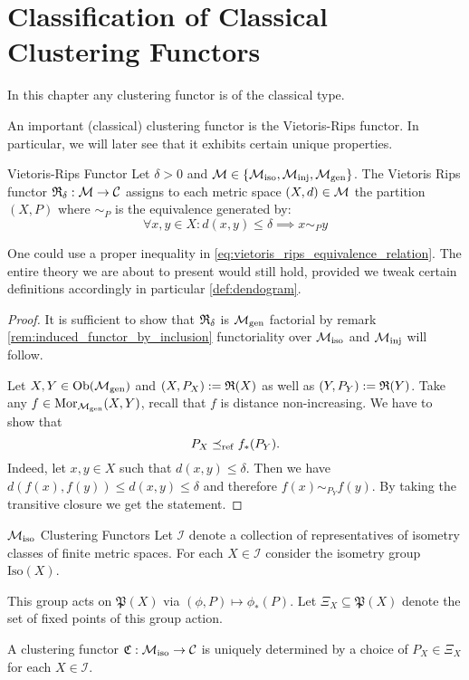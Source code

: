 \chapter{Classification of Classical Clustering Functors}
In this chapter any clustering functor is of the classical type.

An important (classical) clustering functor is the Vietoris-Rips functor.
In particular, we will later see that it exhibits certain unique properties.

\begin{defprop}{Vietoris-Rips Functor}{}
    Let $\delta > 0$ and $\mathcal{M} \in \{{\mathcal{M}_\mathrm{iso}}, {\mathcal{M}_\mathrm{inj}}, {\mathcal{M}_\mathrm{gen}}\}$. The Vietoris Rips functor $\mathfrak{R}_\delta: \mathcal{M} \to \mathcal{C}$ assigns to each metric space $(X,d) \in \mathcal{M}$ the partition $(X,P)$ where $\sim_P$ is the equivalence generated by:
    \begin{equation}
        \label{eq:vietoris_rips_equivalence_relation}
        \forall x,y \in X: d(x,y) \leq \delta \implies x \sim_P y
    \end{equation}
\end{defprop}

One could use a proper inequality in \eqref{eq:vietoris_rips_equivalence_relation}. The entire theory we are about to present would still hold, provided we tweak certain definitions accordingly in particular \ref{def:dendogram}.

\begin{proof}
It is sufficient to show that $\mathfrak{R}_\delta$ is ${\mathcal{M}_\mathrm{gen}}$ factorial by remark \ref{rem:induced_functor_by_inclusion} functoriality over ${\mathcal{M}_\mathrm{iso}}$ and ${\mathcal{M}_\mathrm{inj}}$ will follow.

Let $X,Y \in \mathrm {Ob}({\mathcal{M}_\mathrm{gen}})$ and $(X,P_X) := \mathfrak{R}(X)$ as well as $(Y,P_Y) := \mathfrak{R}(Y)$.
Take any $f \in \mathrm {Mor}_{\mathcal{M}_\mathrm{gen}}(X,Y)$, recall that $f$ is distance non-increasing.
We have to show that 
$$P_X \preceq_\mathrm{ref} f_*(P_Y).$$
Indeed, let $x,y \in X$ such that $d(x,y) \leq \delta$.
Then we have $d(f(x), f(y)) \leq d(x,y) \leq \delta$ and therefore $f(x) \sim_{P_Y} f(y)$.
By taking the transitive closure we get the statement.
\end{proof}

\begin{myremark}{${\mathcal{M}_\mathrm{iso}}$ Clustering Functors}{}
Let $\mathcal{I}$ denote a collection of representatives of isometry classes of finite metric spaces.
For each $X \in \mathcal{I}$ consider the isometry group $\mathrm{Iso}(X)$. \par

\medskip This group acts on $\mathfrak{P}(X)$ via $(\phi, P) \mapsto \phi_*(P)$.
Let $\Xi_X \subseteq \mathfrak{P}(X)$ denote the set of fixed points of this group action. \par

\medskip A clustering functor $\mathfrak{C}: {\mathcal{M}_\mathrm{iso}} \to \mathcal{C}$ is uniquely determined by a choice of $P_X \in \Xi_X$ for each $X \in \mathcal{I}$.
\end{myremark}

